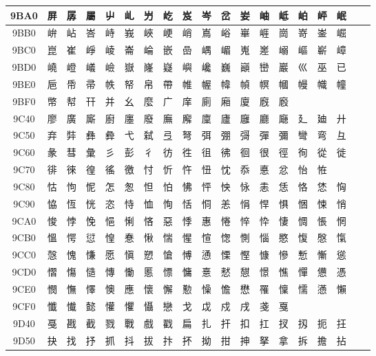 \begin{table}[H]
\begin{tabular}{|Sc|*{16}{>{\centering\arraybackslash}p{1em}|}>{\centering\arraybackslash}p{2.5em}|}
9BA0 & 屏 & 孱 & 屬 & 屮 & 乢 & 屶 & 屹 & 岌 & 岑 & 岔 & 妛 & 岫 & 岻 & 岶 & 岼 & 岷 \\ \hline
9BB0 & 峅 & 岾 & 峇 & 峙 & 峩 & 峽 & 峺 & 峭 & 嶌 & 峪 & 崋 & 崕 & 崗 & 嵜 & 崟 & 崛 \\ \hline
9BC0 & 崑 & 崔 & 崢 & 崚 & 崙 & 崘 & 嵌 & 嵒 & 嵎 & 嵋 & 嵬 & 嵳 & 嵶 & 嶇 & 嶄 & 嶂 \\ \hline
9BD0 & 嶢 & 嶝 & 嶬 & 嶮 & 嶽 & 嶐 & 嶷 & 嶼 & 巉 & 巍 & 巓 & 巒 & 巖 & 巛 & 巫 & 已 \\ \hline
9BE0 & 巵 & 帋 & 帚 & 帙 & 帑 & 帛 & 帶 & 帷 & 幄 & 幃 & 幀 & 幎 & 幗 & 幔 & 幟 & 幢 \\ \hline
9BF0 & 幤 & 幇 & 幵 & 并 & 幺 & 麼 & 广 & 庠 & 廁 & 廂 & 廈 & 廐 & 廏 & & & \\ \hline
9C40 & 廖 & 廣 & 廝 & 廚 & 廛 & 廢 & 廡 & 廨 & 廩 & 廬 & 廱 & 廳 & 廰 & 廴 & 廸 & 廾 \\ \hline
9C50 & 弃 & 弉 & 彝 & 彜 & 弋 & 弑 & 弖 & 弩 & 弭 & 弸 & 彁 & 彈 & 彌 & 彎 & 弯 & 彑 \\ \hline
9C60 & 彖 & 彗 & 彙 & 彡 & 彭 & 彳 & 彷 & 徃 & 徂 & 彿 & 徊 & 很 & 徑 & 徇 & 從 & 徙 \\ \hline
9C70 & 徘 & 徠 & 徨 & 徭 & 徼 & 忖 & 忻 & 忤 & 忸 & 忱 & 忝 & 悳 & 忿 & 怡 & 恠 & \\ \hline
9C80 & 怙 & 怐 & 怩 & 怎 & 怱 & 怛 & 怕 & 怫 & 怦 & 怏 & 怺 & 恚 & 恁 & 恪 & 恷 & 恟 \\ \hline
9C90 & 恊 & 恆 & 恍 & 恣 & 恃 & 恤 & 恂 & 恬 & 恫 & 恙 & 悁 & 悍 & 惧 & 悃 & 悚 & 悄 \\ \hline
9CA0 & 悛 & 悖 & 悗 & 悒 & 悧 & 悋 & 惡 & 悸 & 惠 & 惓 & 悴 & 忰 & 悽 & 惆 & 悵 & 惘 \\ \hline
9CB0 & 慍 & 愕 & 愆 & 惶 & 惷 & 愀 & 惴 & 惺 & 愃 & 愡 & 惻 & 惱 & 愍 & 愎 & 慇 & 愾 \\ \hline
9CC0 & 愨 & 愧 & 慊 & 愿 & 愼 & 愬 & 愴 & 愽 & 慂 & 慄 & 慳 & 慷 & 慘 & 慙 & 慚 & 慫 \\ \hline
9CD0 & 慴 & 慯 & 慥 & 慱 & 慟 & 慝 & 慓 & 慵 & 憙 & 憖 & 憇 & 憬 & 憔 & 憚 & 憊 & 憑 \\ \hline
9CE0 & 憫 & 憮 & 懌 & 懊 & 應 & 懷 & 懈 & 懃 & 懆 & 憺 & 懋 & 罹 & 懍 & 懦 & 懣 & 懶 \\ \hline
9CF0 & 懺 & 懴 & 懿 & 懽 & 懼 & 懾 & 戀 & 戈 & 戉 & 戍 & 戌 & 戔 & 戛 & & & \\ \hline
9D40 & 戞 & 戡 & 截 & 戮 & 戰 & 戲 & 戳 & 扁 & 扎 & 扞 & 扣 & 扛 & 扠 & 扨 & 扼 & 抂 \\ \hline
9D50 & 抉 & 找 & 抒 & 抓 & 抖 & 拔 & 抃 & 抔 & 拗 & 拑 & 抻 & 拏 & 拿 & 拆 & 擔 & 拈 \\ \hline

\end{tabular}
\end{table}
